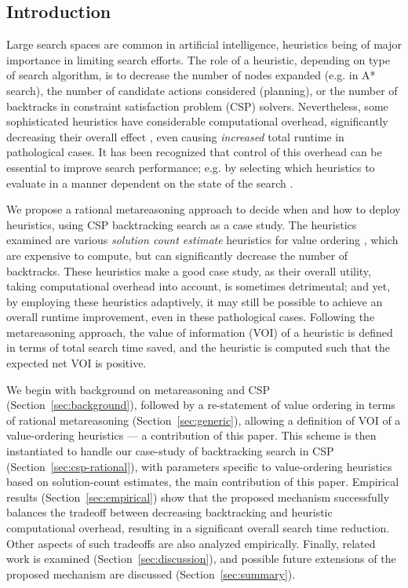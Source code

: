 

\subsection{Introduction}

Large search spaces are common in artificial intelligence, heuristics being
of major importance in limiting search efforts.
The role of a heuristic, depending on type of search algorithm,
is to decrease the number of nodes expanded (e.g. in A* search),
the number of candidate actions considered (planning), or
the number of backtracks in constraint satisfaction problem (CSP) solvers.
Nevertheless, some sophisticated heuristics have considerable
computational overhead, significantly decreasing their overall effect
\cite{HorschHavens.pac,Kask.solcount},
even causing {\em increased} total runtime in pathological cases.
It has been recognized that control of this overhead can be essential
to improve search performance; e.g. by selecting which heuristics to evaluate
in a manner dependent on the state of the search \cite{Wallace.macheur,Domshlak.maxornot}.

We propose a rational metareasoning approach \cite{Russell.right} to decide
when and how to deploy heuristics, using CSP backtracking search as a case study.
The heuristics examined are various {\em solution count estimate} heuristics for
value ordering \cite{Meisels.solcount,HorschHavens.pac}, which
are expensive to compute, but can significantly decrease the number of
backtracks. These heuristics make a good case study, as their overall utility, taking computational
overhead into account, is sometimes detrimental; and yet,
by employing these heuristics adaptively, it may still be possible to achieve an
overall runtime improvement, even in these pathological cases.
Following the metareasoning approach, the value of information (VOI) of
a heuristic is defined in terms of total search time saved, and the
heuristic is computed such that the expected net VOI is positive.

We begin with background on metareasoning and CSP (Section~\ref{sec:background}), 
followed by a re-statement of value ordering in terms
of rational metareasoning (Section~\ref{sec:generic}), allowing a definition of VOI
of a value-ordering heuristics --- a contribution of this paper.
This scheme is then instantiated to handle
our case-study of backtracking search in CSP (Section~\ref{sec:csp-rational}),
with parameters specific to value-ordering
heuristics based on solution-count estimates, the main contribution of this paper.
Empirical results (Section~\ref{sec:empirical})
show that the proposed mechanism successfully balances the tradeoff
between decreasing backtracking and
heuristic computational overhead, resulting in a significant overall search time reduction.
Other aspects of such tradeoffs are also analyzed empirically.
Finally, related work is examined (Section~\ref{sec:discussion}), and
possible future extensions of the proposed mechanism are discussed
(Section~\ref{sec:summary}).


